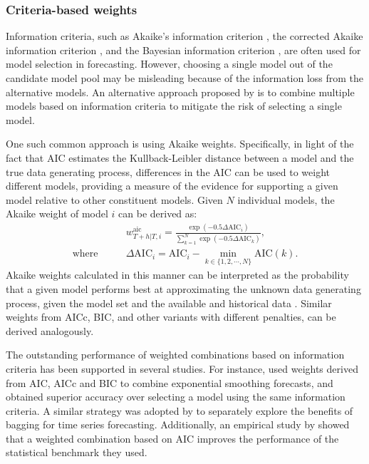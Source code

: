 \documentclass[11pt]{article}
\begin{document}
\subsubsection*{Criteria-based weights}

Information criteria, such as Akaike's information criterion \citep[AIC,][]{Akaike1974-ya}, the corrected Akaike information criterion \citep[AICc,][]{Sugiura1978-xm}, and the Bayesian information criterion \citep[BIC,][]{Schwarz1978-cz}, are often used for model selection in forecasting. However, choosing a single model out of the candidate model pool may be misleading because of the information loss from the alternative models. An alternative approach proposed by \citet{Burnham2002-us} is to combine multiple models based on information criteria to mitigate the risk of selecting a single model.

One such common approach is using Akaike weights. Specifically, in light of the fact that AIC estimates the Kullback-Leibler distance \citep{Kullback1951-hl} between a model and the true data generating process, differences in the AIC can be used to weight different models, providing a measure of the evidence for supporting a given model relative to other constituent models. Given $N$ individual models, the Akaike weight of model $i$ can be derived as:
\begin{align*}
    & w_{T+h|T, i}^{\text{aic}}=\frac{\exp (-0.5 \Delta \mathrm{AIC}_{i})}{\sum_{k=1}^{N} \exp \left(-0.5 \Delta \mathrm{AIC}_{k}\right)}, \\
  \text{where}\qquad
    & \Delta \mathrm{AIC}_{i}=\mathrm{AIC}_{i}-\min _{k \in \{1,2,\cdots,N\}} \mathrm{AIC}(k).
\end{align*}
Akaike weights calculated in this manner can be interpreted as the probability that a given model performs best at approximating the unknown data generating process, given the model set and the available and historical data \citep{Kolassa2011-ai}. Similar weights from AICc, BIC, and other variants with different penalties, can be derived analogously.

The outstanding performance of weighted combinations based on information criteria has been supported in several studies. For instance, \citet{Kolassa2011-ai} used weights derived from AIC, AICc and BIC to combine exponential smoothing forecasts, and obtained superior accuracy over selecting a model using the same information criteria. A similar strategy was adopted by \citet{Petropoulos2018-fw} to separately explore the benefits of bagging for time series forecasting. Additionally, an empirical study by \citet{Petropoulos2018-ad} showed that a weighted combination based on AIC improves the performance of the statistical benchmark they used.
\end{document}
